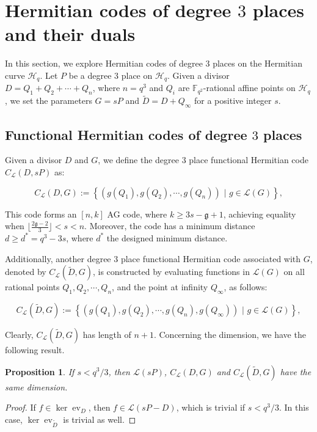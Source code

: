 \documentclass[11pt]{amsart}
\theoremstyle{plain}
\newtheorem{proposition}[theorem]{Proposition}
\theoremstyle{definition}
\theoremstyle{remark}
\newcommand{\g}{\mathfrak{g}}
\DeclareMathOperator{\ev}{ev}
\begin{document}
\section{Hermitian codes of degree $3$ places and their duals \label{sec:Herm}}

In this section, we explore Hermitian codes of degree $3$ places on the Hermitian curve $\mathscr{H}_q$. Let $P$ be a degree $3$ place on $\mathscr{H}_q$. Given a divisor $D=Q_1+Q_2+\cdots+Q_n$, where $n=q^3$ and $Q_i$ are $\mathbb{F}_{q^2}$-rational affine points on $\mathscr{H}_q$, we set the parameters $G=sP$ and $\tilde{D}=D+Q_{\infty}$ for a positive integer $s$.


\subsection{Functional Hermitian codes of degree $3$ places}
Given a divisor $D$ and $G$, we define the degree $3$ place functional Hermitian code $C_{\mathcal{L}}(D,sP)$ as:

\[C_{\mathcal{L}}(D,G):= \left\lbrace \left(g(Q_1),g(Q_2),\cdots,g(Q_n) \right)\,\, |\,\, g \in  \mathscr{L}(G) \right\rbrace, \]

This code forms an $[n,k]$ AG code, where $k\geq 3s-\g+1$, achieving equality when $\lfloor\frac{ 2 \g-2}{3}\rfloor <s<n$. Moreover, the code has a minimum distance $d\geq d^*=q^3-3s$, where $d^*$ the designed minimum distance.

Additionally, another degree $3$ place functional Hermitian code associated with $G$, denoted by $C_{\mathcal{L}}(\tilde{D},G)$, is constructed by evaluating functions in $\mathscr{L}(G)$ on all rational points $Q_1,Q_2,\cdots,Q_n$, and the point at infinity $Q_{\infty}$, as follows:

\[C_{\mathcal{L}}(\tilde{D},G):= \left\lbrace \left(g(Q_1),g(Q_2),\cdots,g(Q_n),g(Q_{\infty}) \right)\,\, |\,\, g \in  \mathscr{L}(G)\right\rbrace ,\]

Clearly, $C_{\mathcal{L}}(\tilde{D},G)$ has length of $n+1$. Concerning the dimension, we have the following result.
\begin{proposition}
If $s< q^3/3$, then $\mathscr{L}(sP)$, $C_{\mathcal{L}}(D,G)$ and $C_{\mathcal{L}}(\tilde{D},G)$ have the same dimension. 
\end{proposition}
\begin{proof}
If $f\in \ker \ev_D$, then $f\in \mathscr{L}(sP-D)$, which is trivial if $s<q^3/3$. In this case, $\ker \ev_{\tilde{D}}$ is trivial as well. 
\end{proof}
\end{document}
